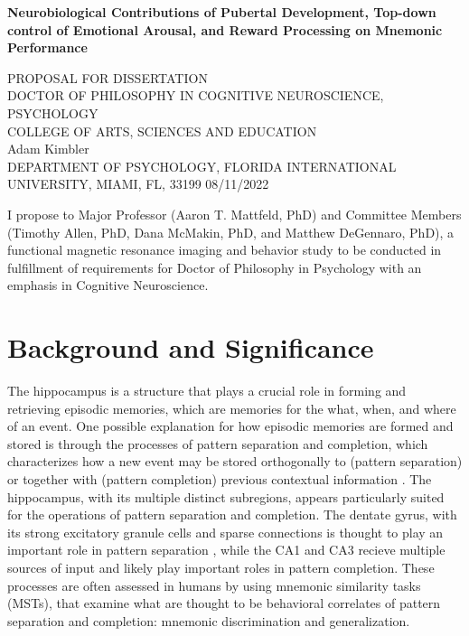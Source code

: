 \documentclass[11pt]{article}
\providecommand\citep{\cite}
\begin{document}
\author{Adam Kimbler}

\begin{titlepage}
    \begin{center}
        \textbf{Neurobiological Contributions of Pubertal Development, Top-down control
            of Emotional Arousal, and Reward Processing on Mnemonic Performance}

        \vspace{0.8cm}
        PROPOSAL FOR DISSERTATION\\
        DOCTOR OF PHILOSOPHY IN COGNITIVE NEUROSCIENCE, PSYCHOLOGY\\
        COLLEGE OF ARTS, SCIENCES AND EDUCATION\\
        \vspace{0.8cm}
        Adam Kimbler\\
        DEPARTMENT OF PSYCHOLOGY, FLORIDA INTERNATIONAL UNIVERSITY, MIAMI, FL, 33199
        08/11/2022
    \end{center}
    \vspace*{\fill}
    I propose to Major Professor (Aaron T. Mattfeld, PhD) and Committee Members
    (Timothy Allen, PhD, Dana McMakin, PhD, and Matthew DeGennaro, PhD), a
    functional magnetic resonance imaging and behavior study to be conducted in
    fulfillment of requirements for Doctor of Philosophy in Psychology with an
    emphasis in Cognitive Neuroscience.
\end{titlepage}
\clearpage

\section*{Background and Significance}

The hippocampus is a structure that plays a crucial role in forming and retrieving
episodic memories, which are memories for the what, when, and where of an event.
One possible explanation for how episodic memories are formed and stored is
through the processes of pattern separation
and completion, which characterizes how a new event may be stored
orthogonally to (pattern separation) or together with (pattern completion) previous
contextual information \citep{yassa_ability_2011}. The hippocampus, with its multiple distinct subregions, appears particularly suited for
the operations of pattern separation and completion. The dentate gyrus, with its strong
excitatory granule cells and sparse connections is thought to play an important role in
pattern separation \citep{treves_mammalian_dentate_2008, mcnaughton_hippocampal_1987,blackstad_distribution_1970,
swanson_autoradiographic_1978}, while the CA1 \citep{burke_shared_function_2018, bakker_pattern_2008,rolls_quantitative_2013, bittner_conjunctive_2015}  and CA3 \citep{Insausti_Amaral_2008,trevino_excitationinhibition_2011} recieve multiple sources of input
and likely play important roles in pattern completion. These processes are often
assessed in humans by using mnemonic similarity tasks (MSTs), that examine what are
thought to be behavioral correlates of pattern separation and completion: mnemonic
discrimination and generalization. \par
\end{document}
